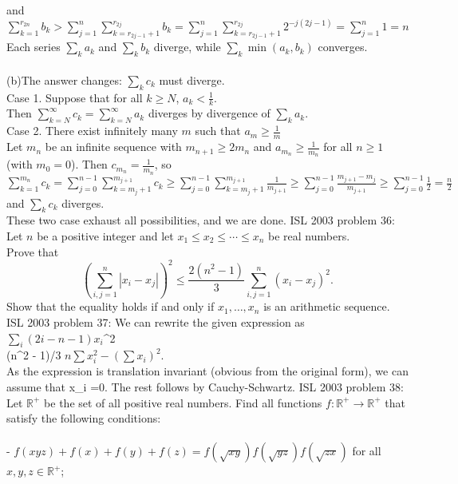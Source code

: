 and \\
$\displaystyle \sum_{k=1}^{r_{2n}}b_k > \sum_{j=1}^n \sum_{k=r_{2j-1}+1}^{r_{2j}}b_k = \sum_{j=1}^n \sum_{k=r_{2j-1}+1}^{r_{2j}}2^{-j(2j-1)} = \sum_{j=1}^n 1 = n$ \\
Each series $\sum_k a_k$ and $\sum_k b_k$ diverge, while $\sum_k \min(a_k,b_k)$ converges. \\\\
(b)The answer changes: $\sum_k c_k$ must diverge. \\
Case 1. Suppose that for all $k \ge N$, $a_k < \frac{1}{k}$. \\
Then $\displaystyle \sum_{k=N}^{\infty} c_k = \sum_{k=N}^{\infty} a_k$ diverges by divergence of $\sum_k a_k$. \\
Case 2. There exist infinitely many $m$ such that $a_m \ge \frac{1}{m}$ \\
Let $m_n$ be an infinite sequence with $m_{n+1} \ge 2m_n$ and $a_{m_n} \ge \frac{1}{m_n}$ for all $n \ge 1$ (with $m_0=0$). Then $c_{m_n}=\frac{1}{m_n}$, so \\
$\displaystyle \sum_{k=1}^{m_n} c_k = \sum_{j=0}^{n-1} \sum_{k=m_j+1}^{m_{j+1}} c_k \ge \sum_{j=0}^{n-1} \sum_{k=m_j+1}^{m_{j+1}} \frac{1}{m_{j+1}} \ge \sum_{j=0}^{n-1}\frac{m_{j+1}-m_j}{m_{j+1}} \ge \sum_{j=0}^{n-1} \frac{1}{2} = \frac{n}{2}$ \\
and $\sum_k c_k$ diverges. \\
These two case exhaust all possibilities, and we are done. 
ISL 2003 problem 36:  Let $n$ be a positive integer and let $x_1\le x_2\le\cdots\le x_n$ be real numbers. \\
Prove that
\[ \left(\sum_{i,j=1}^n|x_i-x_j|\right)^2\le\frac{2(n^2-1)}{3}\sum_{i,j=1}^n(x_i-x_j)^2. \]
Show that the equality holds if and only if $x_1, \ldots, x_n$ is an arithmetic sequence. 
ISL 2003 problem 37:  We can rewrite the given expression as \\
\( \sum_i (2i-n-1)x_i \)^2 \\
\leq (n^2 - 1)/3 \( n\sum x_i^2 - (\sum x_i )^2\). \\
As the expression is translation invariant (obvious from the original form), we can assume that \sum x_i =0. The rest follows by Cauchy-Schwartz. 
ISL 2003 problem 38:  Let $\mathbb{R}^+$ be the set of all positive real numbers. Find all functions $f: \mathbb{R}^+ \to \mathbb{R}^+$ that satisfy the following conditions: \\\\
- $f(xyz)+f(x)+f(y)+f(z)=f(\sqrt{xy})f(\sqrt{yz})f(\sqrt{zx})$ for all $x,y,z\in\mathbb{R}^+$; \\\\
